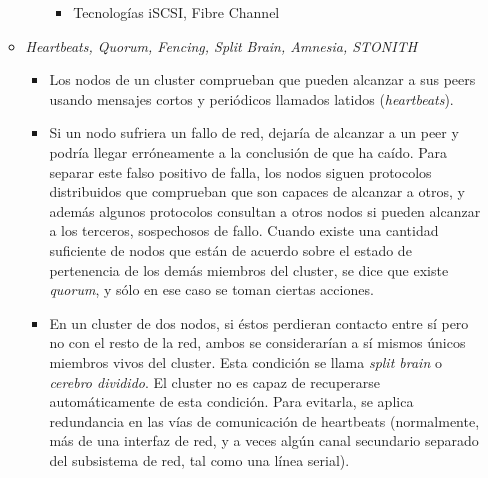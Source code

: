 \begin{itemize}
\begin{itemize}
\begin{itemize}
\begin{itemize}
				\item Tecnologías iSCSI, Fibre Channel
			\end{itemize}
		\end{itemize}
		\item \textit{Heartbeats, Quorum, Fencing, Split Brain, Amnesia, STONITH}
		\begin{itemize}
			\item Los nodos de un cluster comprueban que pueden alcanzar a sus peers usando mensajes cortos y periódicos llamados latidos (\textit{heartbeats}).
			\item Si un nodo sufriera un fallo de red, dejaría de alcanzar a un peer y podría llegar erróneamente a la conclusión de que ha caído. Para separar este falso positivo de falla, los nodos siguen protocolos distribuidos que comprueban que son capaces de alcanzar a otros, y además algunos protocolos consultan a otros nodos si pueden alcanzar a los terceros, sospechosos de fallo. Cuando existe una cantidad suficiente de nodos que están de acuerdo sobre el estado de pertenencia de los demás miembros del cluster, se dice que existe \textit{quorum}, y sólo en ese caso se toman ciertas acciones.
			\item En un cluster de dos nodos, si éstos perdieran contacto entre sí pero no con el resto de la red, ambos se considerarían a sí mismos únicos miembros vivos del cluster. Esta condición se llama \textit{split brain} o \textit{cerebro dividido}. El cluster no es capaz de recuperarse automáticamente de esta condición. Para evitarla, se aplica redundancia en las vías de comunicación de heartbeats (normalmente, más de una interfaz de red, y a veces algún canal secundario separado del subsistema de red, tal como una línea serial).


\end{itemize}
\end{itemize}
\end{itemize}
